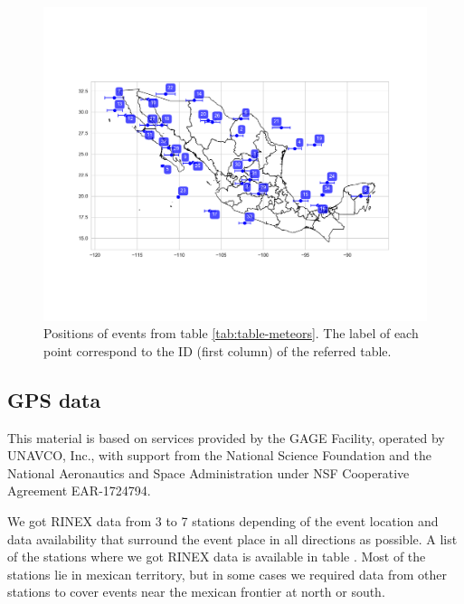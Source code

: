 \begin{figure}
  \centering
  \includegraphics[width=\linewidth]{../meteors_map}
  \caption{Positions of events from table \ref{tab:table-meteors}. The label of each point correspond to the ID (first column) of the referred table.}
  \label{fig:meteors-map}
\end{figure}

\subsection{GPS data}

This material is based on services provided by the GAGE Facility, operated by UNAVCO, Inc., with support from the National Science Foundation and the National Aeronautics and Space Administration under NSF Cooperative Agreement EAR-1724794.

We got RINEX data from 3 to 7 stations depending of the event location and data availability that surround the event place in all directions as possible. A list of the stations where we got RINEX data is available in table  . Most of the stations lie in mexican territory, but in some cases we required data from other stations to cover events near the mexican frontier at north or south.

